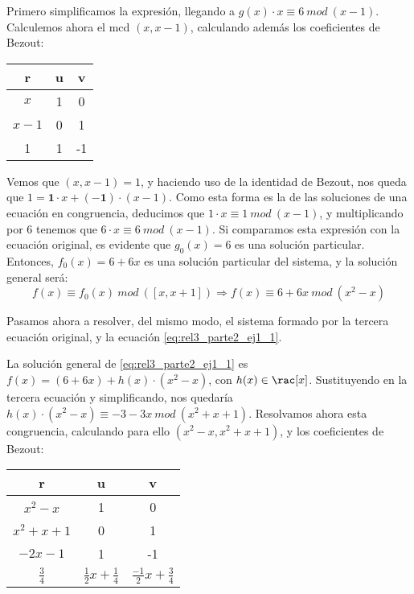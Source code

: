Primero simplificamos la expresión, llegando a $g(x)\cdot x \equiv 6\ mod\ (x-1)$. Calculemos ahora el mcd $(x,x-1)$, calculando además los coeficientes de Bezout:

\begin{center}
\begin{tabular}{c|cc}
\textbf{r}    & \textbf{u} & \textbf{v}  \\ \hline
$x$           & 1          & 0           \\
$x-1$         & 0          & 1           \\ 
1             & 1          & -1          \\ 
\end{tabular}
\end{center} 

Vemos que $(x,x-1) = 1$, y haciendo uso de la identidad de Bezout, nos queda que $1 = \bm{1}\cdot x + \bm{(-1)}\cdot (x-1)$. Como esta forma es la de las soluciones de una ecuación en congruencia, deducimos que $1\cdot x \equiv 1\ mod\ (x-1)$, y multiplicando por $6$ tenemos que $6\cdot x \equiv 6\ mod\ (x-1)$. Si comparamos esta expresión con la ecuación original, es evidente que $g_0(x) = 6$ es una solución particular. Entonces, $f_0(x) = 6 + 6x$ es una solución particular del sistema, y la solución general será: 
\begin{equation} \label{eq:rel3_parte2_ej1_1}
f(x) \equiv f_0(x)\ mod\ ([x,x+1]) \Rightarrow f(x) \equiv 6 + 6x\ mod\ (x^2 - x)
\end{equation}

Pasamos ahora a resolver, del mismo modo, el sistema formado por la tercera ecuación original, y la ecuación \eqref{eq:rel3_parte2_ej1_1}.

La solución general de \eqref{eq:rel3_parte2_ej1_1} es $f(x) = (6 + 6x) + h(x)\cdot (x^2-x)$, con $h(x) \in \rac[x]$. Sustituyendo en la tercera ecuación y simplificando, nos quedaría $h(x)\cdot (x^2 - x) \equiv -3 -3x\ mod\ (x^2+x+1)$. Resolvamos ahora esta congruencia, calculando para ello $(x^2-x,x^2+x+1)$, y los coeficientes de Bezout:

\begin{center}
\begin{tabular}{c|cc}
\textbf{r}    & \textbf{u} & \textbf{v}  \\ \hline
$x^2-x$           & 1          & 0           \\
$x^2+x+1$         & 0          & 1           \\ 
$-2x-1$             & 1          & -1          \\ 
$\frac{3}{4}$       & $\frac{1}{2}x + \frac{1}{4}$ & $\frac{-1}{2}x + \frac{3}{4}$
\end{tabular}
\end{center} 

